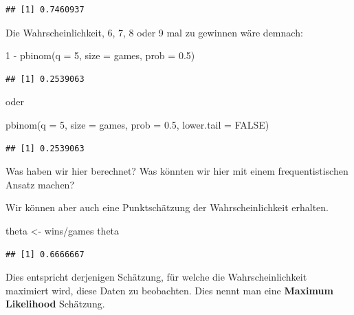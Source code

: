 \documentclass[]{tufte-handout}
\newenvironment{Shaded}{}{}
\newcommand{\AttributeTok}[1]{\textcolor[rgb]{0.49,0.56,0.16}{#1}}
\newcommand{\ConstantTok}[1]{\textcolor[rgb]{0.53,0.00,0.00}{#1}}
\newcommand{\DecValTok}[1]{\textcolor[rgb]{0.25,0.63,0.44}{#1}}
\newcommand{\FloatTok}[1]{\textcolor[rgb]{0.25,0.63,0.44}{#1}}
\newcommand{\FunctionTok}[1]{\textcolor[rgb]{0.02,0.16,0.49}{#1}}
\newcommand{\NormalTok}[1]{#1}
\newcommand{\OtherTok}[1]{\textcolor[rgb]{0.00,0.44,0.13}{#1}}
\newcommand{\SpecialCharTok}[1]{\textcolor[rgb]{0.25,0.44,0.63}{#1}}
\begin{document}
\begin{verbatim}
## [1] 0.7460937
\end{verbatim}

Die Wahrscheinlichkeit, 6, 7, 8 oder 9 mal zu gewinnen wäre demnach:

\begin{Shaded}
\begin{Highlighting}[]
\DecValTok{1} \SpecialCharTok{{-}} \FunctionTok{pbinom}\NormalTok{(}\AttributeTok{q =} \DecValTok{5}\NormalTok{, }\AttributeTok{size =}\NormalTok{ games, }\AttributeTok{prob =} \FloatTok{0.5}\NormalTok{)}
\end{Highlighting}
\end{Shaded}

\begin{verbatim}
## [1] 0.2539063
\end{verbatim}

oder

\begin{Shaded}
\begin{Highlighting}[]
\FunctionTok{pbinom}\NormalTok{(}\AttributeTok{q =} \DecValTok{5}\NormalTok{, }\AttributeTok{size =}\NormalTok{ games, }\AttributeTok{prob =} \FloatTok{0.5}\NormalTok{, }\AttributeTok{lower.tail =} \ConstantTok{FALSE}\NormalTok{)}
\end{Highlighting}
\end{Shaded}

\begin{verbatim}
## [1] 0.2539063
\end{verbatim}

Was haben wir hier berechnet? Was könnten wir hier mit einem
frequentistischen Ansatz machen?

Wir können aber auch eine Punktschätzung der Wahrscheinlichkeit
erhalten.

\begin{Shaded}
\begin{Highlighting}[]
\NormalTok{theta }\OtherTok{\textless{}{-}}\NormalTok{ wins}\SpecialCharTok{/}\NormalTok{games}
\NormalTok{theta}
\end{Highlighting}
\end{Shaded}

\begin{verbatim}
## [1] 0.6666667
\end{verbatim}

Dies entspricht derjenigen Schätzung, für welche die Wahrscheinlichkeit
maximiert wird, diese Daten zu beobachten. Dies nennt man eine
\textbf{Maximum Likelihood} Schätzung.
\end{document}
